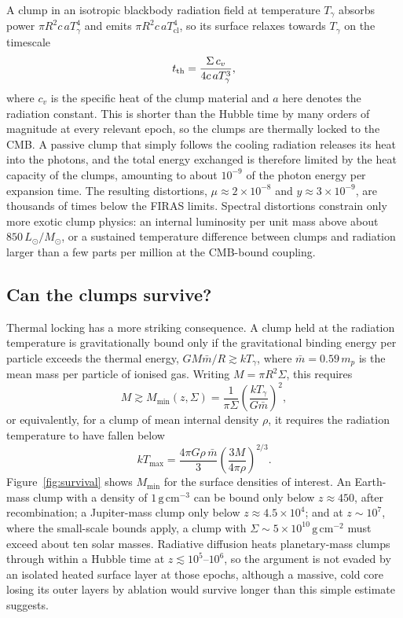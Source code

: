 \documentclass[11pt,a4paper]{article}
\newcommand{\Msun}{M_\odot}
\newcommand{\cl}{\mathrm{cl}}
\begin{document}
A clump in an isotropic blackbody radiation field at temperature $T_\gamma$ absorbs power $\pi R^2 c\,aT_\gamma^4$ and emits $\pi R^2 c\,aT_\cl^4$, so its surface relaxes towards $T_\gamma$ on the timescale
\begin{equation}
t_{\rm th} = \frac{\Sigma\,c_v}{4c\,aT_\gamma^3},
\end{equation}
where $c_v$ is the specific heat of the clump material and $a$ here denotes the radiation constant. This is shorter than the Hubble time by many orders of magnitude at every relevant epoch, so the clumps are thermally locked to the CMB. A passive clump that simply follows the cooling radiation releases its heat into the photons, and the total energy exchanged is therefore limited by the heat capacity of the clumps, amounting to about $10^{-9}$ of the photon energy per expansion time. The resulting distortions, $\mu\approx2\times10^{-8}$ and $y\approx3\times10^{-9}$, are thousands of times below the FIRAS limits. Spectral distortions constrain only more exotic clump physics: an internal luminosity per unit mass above about $850\,L_\odot/\Msun$, or a sustained temperature difference between clumps and radiation larger than a few parts per million at the CMB-bound coupling.

\subsection{Can the clumps survive?}

Thermal locking has a more striking consequence. A clump held at the radiation temperature is gravitationally bound only if the gravitational binding energy per particle exceeds the thermal energy, $GM\bar m/R \gtrsim kT_\gamma$, where $\bar m = 0.59\,m_p$ is the mean mass per particle of ionised gas. Writing $M = \pi R^2\Sigma$, this requires
\begin{equation}
M \gtrsim M_{\min}(z,\Sigma) = \frac{1}{\pi\Sigma}\left(\frac{kT_\gamma}{G\bar m}\right)^2,
\end{equation}
or equivalently, for a clump of mean internal density $\rho$, it requires the radiation temperature to have fallen below
\begin{equation}
kT_{\max} = \frac{4\pi G\rho\,\bar m}{3}\left(\frac{3M}{4\pi\rho}\right)^{2/3}.
\end{equation}
Figure~\ref{fig:survival} shows $M_{\min}$ for the surface densities of interest. An Earth-mass clump with a density of $1\,\mathrm{g\,cm^{-3}}$ can be bound only below $z\approx450$, after recombination; a Jupiter-mass clump only below $z\approx4.5\times10^4$; and at $z\sim10^7$, where the small-scale bounds apply, a clump with $\Sigma\sim5\times10^{10}\,\mathrm{g\,cm^{-2}}$ must exceed about ten solar masses. Radiative diffusion heats planetary-mass clumps through within a Hubble time at $z\lesssim10^5$--$10^6$, so the argument is not evaded by an isolated heated surface layer at those epochs, although a massive, cold core losing its outer layers by ablation would survive longer than this simple estimate suggests.
\end{document}

